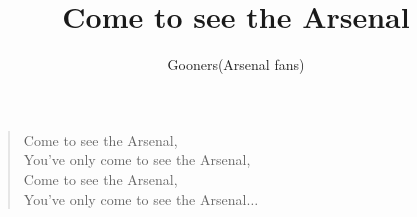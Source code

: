 \documentclass[a4paper,12pt]{article}
\title{Come to see the Arsenal}
\author{Gooners(Arsenal fans)}
\date{}
\begin{document}
	
	\maketitle
	
	\begin{verse}
		
		Come to see the Arsenal, \\
		You've only come to see the Arsenal, \\
		Come to see the Arsenal, \\
		You've only come to see the Arsenal$\ldots$
		
	\end{verse}
	
\end{document}
